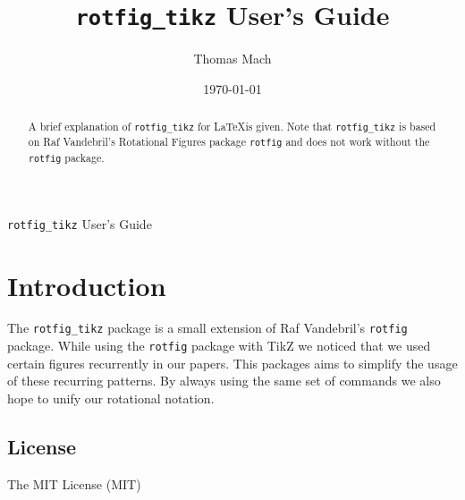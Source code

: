 \documentclass[final]{siamltex}
\title{\texttt{rotfig\_tikz} User's Guide}
\author{Thomas Mach\footnotemark[3]}
\begin{document}
\maketitle

\renewcommand{\thefootnote}{\fnsymbol{footnote}}

%

\renewcommand{\thefootnote}{\arabic{footnote}}


\date{\today}
\maketitle

\begin{abstract}
  A brief explanation of \texttt{rotfig\_tikz} for \LaTeX is given. Note that
  \texttt{rotfig\_tikz} is based on Raf Vandebril's Rotational Figures package
  \texttt{rotfig} and does not work without the \texttt{rotfig} package.
\end{abstract}

\pagestyle{myheadings} %
\thispagestyle{plain} %
%
{\texttt{rotfig\_tikz} User's Guide}


\section{Introduction}
\label{sec:introduction}

The \texttt{rotfig\_tikz} package is a small extension of Raf Vandebril's
\texttt{rotfig} package. While using the \texttt{rotfig} package with TikZ we
noticed that we used certain figures recurrently in our papers. This packages
aims to simplify the usage of these recurring patterns. By always using the
same set of commands we also hope to unify our rotational notation.

\subsection{License}
The MIT License (MIT)
\end{document}
